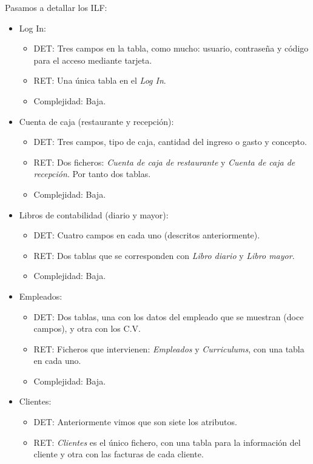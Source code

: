 \documentclass[spanish,a4paper,12pt]{report}	%
\begin{document}
	Pasamos a detallar los ILF:
	\begin{itemize}
		\item{Log In:} 
		\begin{itemize}
 			\item{DET:} Tres campos en la tabla, como mucho: usuario, contraseña y código para el acceso mediante tarjeta.
			\item{RET:} Una única tabla en el \textit{Log In}.
			\item{Complejidad:} Baja.
		\end{itemize}
		\item{Cuenta de caja (restaurante y recepción):} 
		\begin{itemize}
 			\item{DET:} Tres campos, tipo de caja, cantidad del ingreso o gasto y concepto.
			\item{RET:} Dos ficheros: \textit{Cuenta de caja de restaurante} y \textit{Cuenta de caja de recepción}. Por tanto dos tablas.
			\item{Complejidad:} Baja.
		\end{itemize}
		\item{Libros de contabilidad (diario y mayor):} 
		\begin{itemize}
 			\item{DET:} Cuatro campos en cada uno (descritos anteriormente).
			\item{RET:} Dos tablas que se corresponden con \textit{Libro diario} y \textit{Libro mayor}.
			\item{Complejidad:} Baja.
		\end{itemize}
		\item{Empleados:} 
		\begin{itemize}
 			\item{DET:} Dos tablas, una con los datos del empleado que se muestran (doce campos), y otra con los C.V.
			\item{RET:} Ficheros que intervienen: \textit{Empleados} y \textit{Curriculums}, con una tabla en cada uno.
			\item{Complejidad:} Baja.
		\end{itemize}
		\item{Clientes:} 
		\begin{itemize}
 			\item{DET:} Anteriormente vimos que son siete los atributos.
			\item{RET:} \textit{Clientes} es el único fichero, con una tabla para la información del cliente y otra con las facturas de cada cliente.

\end{itemize}
\end{itemize}
\end{document}

